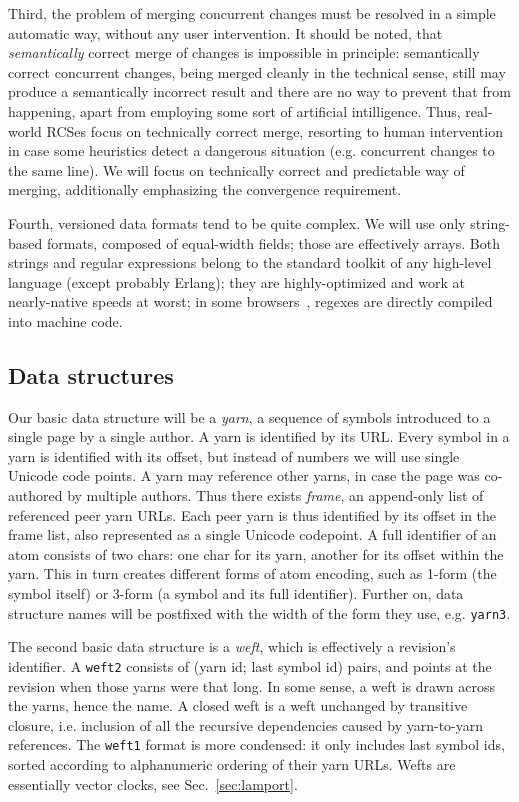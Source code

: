 \documentclass{acm_proc_article-sp}
\begin{document}
Third, the problem of merging concurrent changes must
be resolved in a simple automatic way, without any user
intervention. It should be noted, that
\emph{semantically} correct merge of changes is impossible
in principle: semantically correct concurrent
changes, being merged cleanly in
the technical sense, still may produce a semantically
incorrect result and there are no way to prevent that
from happening,
apart from employing some sort of artificial
intilligence. Thus, real-world RCSes focus on technically
correct merge, resorting to human intervention in case
some heuristics detect a dangerous situation (e.g.
concurrent changes to the same line).
We will focus on technically correct and predictable way
of merging, additionally emphasizing the convergence
requirement.

Fourth, versioned data formats tend to be quite
complex. We will use only string-based formats,
composed of equal-width fields; those are effectively arrays.
Both strings and regular expressions belong to the standard
toolkit of any high-level language (except probably
Erlang); they are highly-optimized and work at nearly-native
speeds at worst; in some browsers~\cite{wrec}, regexes are
directly compiled into machine code.

\subsection{Data structures}

Our basic data structure will be a \emph{yarn}, a sequence of
symbols introduced to a single page by a single author.
A yarn is identified by its URL.
Every symbol in a yarn is identified with its offset,
but instead of numbers we will use single Unicode code points.
A yarn may reference other yarns, in case the page was
co-authored by multiple authors.
Thus there exists \emph{frame}, an append-only list
of referenced peer yarn URLs. Each peer yarn is thus
identified by its offset in the frame list, also represented as
a single Unicode codepoint. A full identifier of an atom
consists of two chars: one char for its yarn, another
for its offset within the yarn. This in turn creates
different forms of atom encoding, such as 1-form
(the symbol itself) or 3-form (a symbol and its full
identifier).
Further on, data structure names will be postfixed
with the width of the form they use, e.g. {\tt yarn3}.

The second basic data structure is a \emph{weft}, which
is effectively a revision's identifier. A {\tt weft2} consists
of (yarn id; last symbol id) pairs, and points at the
revision when those yarns were that long. 
In some sense, a weft is drawn across the yarns,
hence the name. A closed weft is
a weft unchanged by transitive closure, i.e. inclusion of
all the recursive dependencies caused by yarn-to-yarn
references. The {\tt weft1} format is more condensed:
it only includes last symbol ids, sorted
according to alphanumeric ordering of their yarn URLs.
Wefts are essentially vector clocks,
see Sec.~\ref{sec:lamport}.
\end{document}
